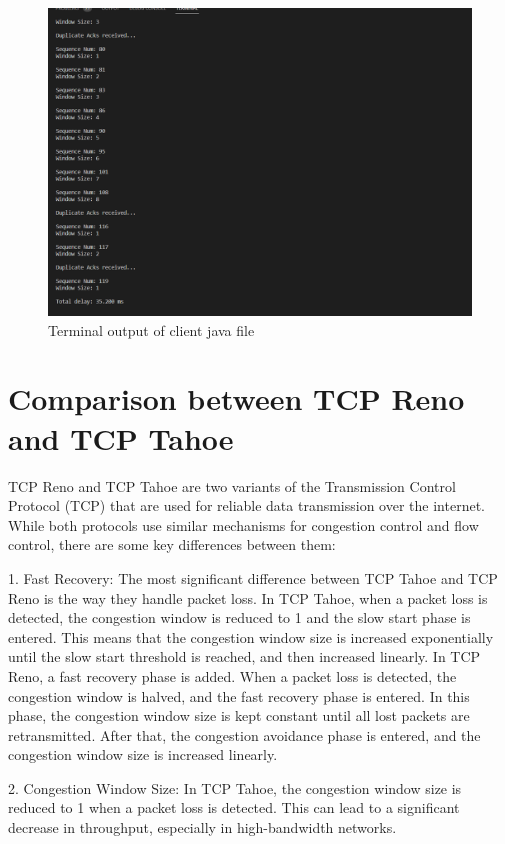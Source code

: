 \documentclass[11pt]{article}
\begin{document}
 \begin{figure}[!h]
\centering
\includegraphics[width=\textwidth]{t_client3.png}
\caption{Terminal output of client java file }
\end{figure}
\FloatBarrier


\section{Comparison between TCP Reno and TCP Tahoe }
TCP Reno and TCP Tahoe are two variants of the Transmission Control Protocol (TCP) that are used for reliable data transmission over the internet. While both protocols use similar mechanisms for congestion control and flow control, there are some key differences between them:

1. Fast Recovery: The most significant difference between TCP Tahoe and TCP Reno is the way they handle packet loss. In TCP Tahoe, when a packet loss is detected, the congestion window is reduced to 1 and the slow start phase is entered. This means that the congestion window size is increased exponentially until the slow start threshold is reached, and then increased linearly.
In TCP Reno, a fast recovery phase is added. When a packet loss is detected, the congestion window is halved, and the fast recovery phase is entered. In this phase, the congestion window size is kept constant until all lost packets are retransmitted. After that, the congestion avoidance phase is entered, and the congestion window size is increased linearly.

2. Congestion Window Size: In TCP Tahoe, the congestion window size is reduced to 1 when a packet loss is detected. This can lead to a significant decrease in throughput, especially in high-bandwidth networks. 
\end{document}
